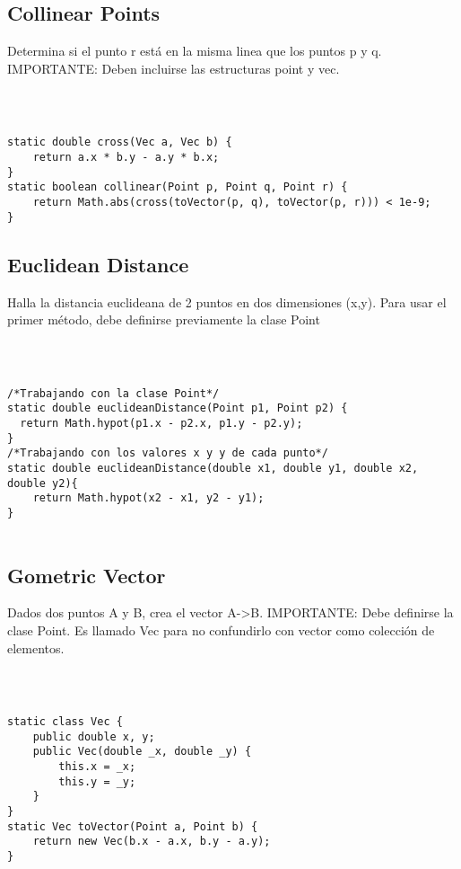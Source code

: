 \documentclass[11pt,letterpaper,twocolumn,twosided]{article}
\begin{document}
\subsection{Collinear Points}
Determina si el punto r est\'a en la misma linea que los puntos p y q. IMPORTANTE: Deben incluirse las estructuras point y vec.
\begin{lstlisting}



static double cross(Vec a, Vec b) { 
	return a.x * b.y - a.y * b.x; 
}
static boolean collinear(Point p, Point q, Point r) {
	return Math.abs(cross(toVector(p, q), toVector(p, r))) < 1e-9; 
}
\end{lstlisting}

\subsection{Euclidean Distance}
Halla la distancia euclideana de 2 puntos en dos dimensiones (x,y). Para usar el primer m\'etodo, debe definirse previamente la clase Point
\begin{lstlisting}


    
/*Trabajando con la clase Point*/
static double euclideanDistance(Point p1, Point p2) {           
  return Math.hypot(p1.x - p2.x, p1.y - p2.y); 
} 
/*Trabajando con los valores x y y de cada punto*/
static double euclideanDistance(double x1, double y1, double x2, double y2){ 
    return Math.hypot(x2 - x1, y2 - y1);         
} 


\end{lstlisting}

\subsection{Gometric Vector}
Dados dos puntos A y B, crea el vector A->B. IMPORTANTE: Debe definirse la clase Point. Es llamado Vec para no confundirlo con vector como colecci\'on de elementos.
\begin{lstlisting}



static class Vec { 
    public double x, y;
    public Vec(double _x, double _y) {
        this.x = _x;
        this.y = _y;
    }
}
static Vec toVector(Point a, Point b) {       
	return new Vec(b.x - a.x, b.y - a.y); 
}



\end{lstlisting}
\end{document}
